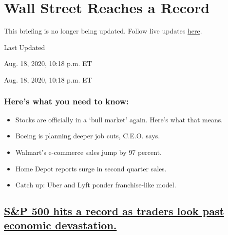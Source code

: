 \hypertarget{wall-street-reaches-a-record}{%
\section{Wall Street Reaches a
Record}\label{wall-street-reaches-a-record}}

This briefing is no longer being updated. Follow live updates
\href{https://www.nytimes3xbfgragh.onion/2020/08/18/world/coronavirus-covid.html}{here}.

Last Updated

Aug. 18, 2020, 10:18 p.m. ET

Aug. 18, 2020, 10:18 p.m. ET

\hypertarget{heres-what-you-need-to-know}{%
\subsubsection{Here's what you need to
know:}\label{heres-what-you-need-to-know}}

\begin{itemize}
\item
  \protect\hyperlink{stocks-are-officially-in-a-bull-market-again-heres-what-that-means}{}

  Stocks are officially in a `bull market' again. Here's what that
  means.
\item
  \protect\hyperlink{boeing-is-planning-deeper-job-cuts-ceo-says}{}

  Boeing is planning deeper job cuts, C.E.O. says.
\item
  \protect\hyperlink{walmarts-e-commerce-sales-jump-by-97-percent}{}

  Walmart's e-commerce sales jump by 97 percent.
\item
  \protect\hyperlink{home-depot-reports-surge-in-second-quarter-sales}{}

  Home Depot reports surge in second quarter sales.
\item
  \protect\hyperlink{catch-up-uber-and-lyft-ponder-franchise-like-model}{}

  Catch up: Uber and Lyft ponder franchise-like model.
\end{itemize}

\hypertarget{sp-500-hits-a-record-as-traders-look-past-economic-devastation}{%
\subsection{\texorpdfstring{\protect\hyperlink{sp-500-hits-a-record-as-traders-look-past-economic-devastation}{S\&P
500 hits a record as traders look past economic
devastation.}}{S\&P 500 hits a record as traders look past economic devastation.}}\label{sp-500-hits-a-record-as-traders-look-past-economic-devastation}}

